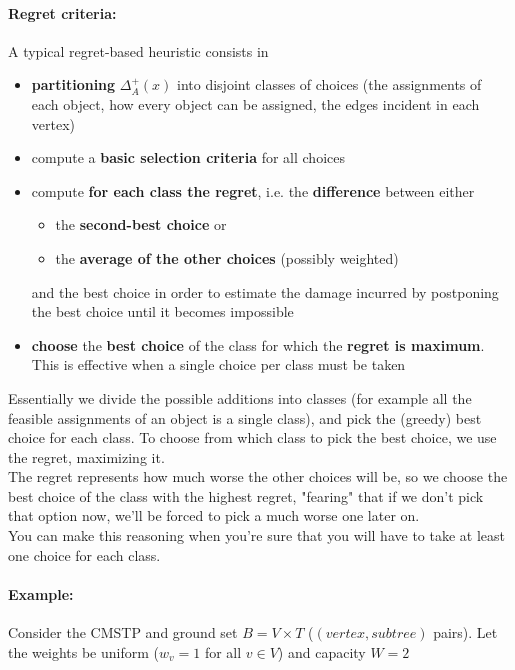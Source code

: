 \paragraph{Regret criteria:} A typical regret-based heuristic consists in
\begin{itemize}
	\item \textbf{partitioning} $\Delta_A^+ (x)$ into disjoint classes of choices (the assignments of each object, how every object can be assigned, the edges incident in each vertex)
	
	\item compute a \textbf{basic selection criteria} for all choices
	
	\item compute \textbf{for each class the regret}, i.e. the \textbf{difference} between either
	\begin{itemize}
		\item the \textbf{second-best choice} or
		\item the \textbf{average of the other choices} (possibly weighted)
	\end{itemize}
	and the best choice in order to estimate the damage incurred by postponing the best choice until it becomes impossible
	
	\item \textbf{choose} the \textbf{best choice} of the class for which the \textbf{regret is maximum}. This is effective when a single choice per class must be taken
\end{itemize}

Essentially we divide the possible additions into classes (for example all the feasible assignments of an object is a single class), and pick the (greedy) best choice for each class. To choose from which class to pick the best choice, we use the regret, maximizing it.\\

The regret represents how much worse the other choices will be, so we choose the best choice of the class with the highest regret, "fearing" that if we don't pick that option now, we'll be forced to pick a much worse one later on. \\

You can make this reasoning when you're sure that you will have to take at least one choice for each class.\\

\paragraph{Example:} Consider the CMSTP and ground set $B = V \times T$ ($(vertex,subtree)$ pairs). Let the weights be uniform ($w_v = 1$ for all $v \in V$) and capacity $W = 2$

